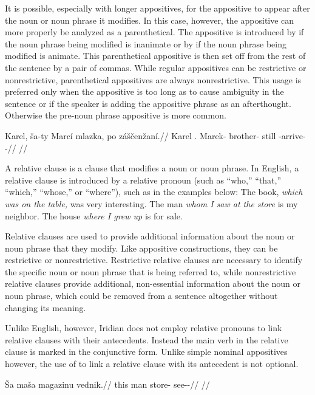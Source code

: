It is possible, especially with longer appositives, for the appositive to appear
after the noun or noun phrase it modifies. In this case, however, the appositive
can more properly be analyzed as a parenthetical. The appositive is introduced
by  if the noun phrase being modified is inanimate or by 
if the noun phrase being modified is animate. This parenthetical appositive is
then set off from the rest of the sentence by a pair of commas. While regular
appositives can be restrictive or nonrestrictive, parenthetical appositives are
always nonrestrictive. This usage is preferred only when the appositive is too
long as to cause ambiguity in the sentence or if the speaker is adding the
appositive phrase as an afterthought. Otherwise the pre-noun phrase appositive
is more common.

\pex
\begingl
  \gla Karel, ša-ty Marcí mlazka, po záščenžaní.//
  \glb Karel \Anim{}.\Lnk{} Marek-\Gen{} brother-\Dim{} still \Neg{}-arrive-\Av{}-\Ret{}//
  \glft {}//
\endgl
\xe

A relative clause is a clause that modifies a noun or
noun phrase. In English, a relative clause is introduced by a
relative pronoun (such as ``who,'' ``that,'' ``which,'' ``whose,'' or
``where''), such as in the examples below:
\pex
  \a The book, \emph{which was on the table,} was very interesting.
  \a The man \emph{whom I saw at the store} is my neighbor.
  \a The house \emph{where I grew up} is for sale.
\xe

Relative clauses are used to provide additional information about the noun or
noun phrase that they modify. Like appositive constructions, they can be
restrictive or nonrestrictive. Restrictive relative clauses are necessary to
identify the specific noun or noun phrase that is being referred to, while
nonrestrictive relative clauses provide additional, non-essential information
about the noun or noun phrase, which could be removed from a sentence altogether
without changing its meaning.

Unlike English, however, Iridian does not employ relative pronouns to link
relative clauses with their antecedents. Instead the main verb in the relative
clause is marked in the conjunctive form. Unlike simple nominal appositives
however, the use of  to link a relative clause with its antecedent is
not optional.

\pex
\a\begingl
  \gla Ša maša magazinu vednik.//
  \glb this man store-\Ins{} see-\Pv{}-\Pf{}//
  \glft {}//
\endgl

